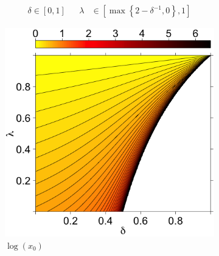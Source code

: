 \documentclass[11pt]{article}
\theoremstyle{definition}
\theoremstyle{definition}
\begin{document}
\begin{align*}
\delta \in [0,1] &&  \lambda &\in \left[  
   \max \left\{ 2-\delta^{-1}, 0\right\}, 1 \right] 
\end{align*}


\begin{figure}[t]
\hspace{-1.2em}
    \centering
    \begin{subfigure}[b]{0.33\textwidth}
        \includegraphics[width=1.07\textwidth, height = \textwidth]{ExtremeX0}
\caption{$\log(x_0)$}	
\label{xOracle}
    \end{subfigure}%
\hspace{0.6em}
    \begin{subfigure}[b]{0.33\textwidth}

\end{subfigure}
\end{figure}
\end{document}
